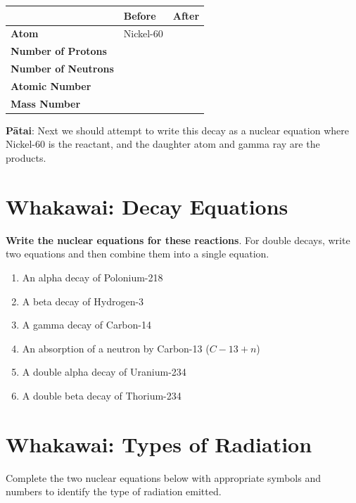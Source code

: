 \documentclass[12pt]{report}
\begin{document}
{\begin{table}[ht]
\centering
\begin{tabular}{|l|p{3cm}|p{3cm}|}
\hline
                            & \textbf{Before} & \textbf{After} \\ \hline
\textbf{Atom}               & Nickel-60       &                \\ \hline
\textbf{Number of Protons}  &                 &                \\ \hline
\textbf{Number of Neutrons} &                 &                \\ \hline
\textbf{Atomic Number}      &                 &                \\ \hline
\textbf{Mass Number}        &                 &                \\ \hline
\end{tabular}
\end{table}

\noindent\textbf{Pātai}: Next we should attempt to write this decay as a nuclear equation where Nickel-60 is the reactant, and the daughter atom and gamma ray are the products.
\vspace{1.5cm}

\section{Whakawai: Decay Equations}
\textbf{Write the nuclear equations for these reactions}. For double decays, write two equations and then combine them into a single equation.
\begin{enumerate}[itemsep=2cm]
	\item An alpha decay of Polonium-218
	\item A beta decay of Hydrogen-3
	\item A gamma decay of Carbon-14
	\item An absorption of a neutron by Carbon-13 ($C-13 + n$)
	\item A double alpha decay of Uranium-234\vspace{1cm}
	\item A double beta decay of Thorium-234\vspace{1cm}
\end{enumerate}

\newpage
\section{Whakawai: Types of Radiation}
Complete the two nuclear equations below with appropriate symbols and numbers to identify the type of radiation emitted. 

}
\end{document}
